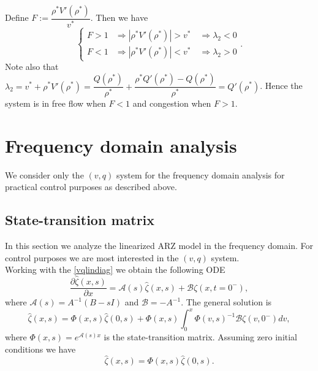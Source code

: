 \documentclass[preprint]{elsarticle}
\begin{document}
Define $F := \dfrac{\rho^*V'( \rho^*)}{v^*}$. Then we have
\begin{equation*}
\begin{cases}
F > 1 &\Rightarrow |\rho^*V'(\rho^*)| > v^* \quad \Rightarrow \lambda_2  <0 \\
F < 1 &\Rightarrow |\rho^*V'(\rho^*)| < v^* \quad \Rightarrow \lambda_2 > 0
\end{cases}.
\end{equation*}
Note also that $\lambda_2 = v^* + \rho^* V'( \rho^*) = \dfrac{Q(\rho^*)}{\rho^*} + \dfrac{\rho^*Q'(\rho^*)-Q(\rho^*)}{\rho^*} = Q'(\rho^*)$. Hence the system is in free flow when $F<1$ and congestion when $F>1$. 


\section{Frequency domain analysis}
We consider only the $(v,q)$ system for the frequency domain analysis for practical control purposes as described above.
\subsection{State-transition matrix}
In this section we analyze the linearized ARZ model in the frequency domain. For control purposes we are most interested in the $(v,q)$ system. \\
Working with the \eqref{vqlindiag} we obtain the following ODE
\begin{equation}
\dfrac{\partial \hat{\zeta} (x,s)}{\partial x} = \mathscr{A}(s)\hat{\zeta}(x,s) + \mathscr{B}\zeta(x,t=0^-),
\end{equation}
where $\mathscr{A}(s) = A^{-1}(B - sI)$ and $\mathscr{B} = -A^{-1}$. 
The general solution is 
\begin{equation}
\hat{\zeta}(x,s) = \Phi(x,s)\hat{\zeta}(0,s) +  \Phi(x,s) \int^x_0 \Phi(v,s)^{-1} \mathscr{B} \zeta(v,0^-)dv,
\end{equation}
where $\Phi(x,s) = e^{\mathscr{A}(s)x}$ is the state-transition matrix. Assuming zero initial conditions we have 
\begin{equation} \label{TFRiemann}
\hat{\zeta}(x,s) = \Phi(x,s)\hat{\zeta}(0,s).
\end{equation}
\end{document}
